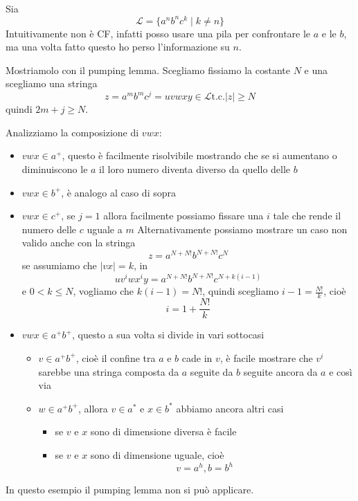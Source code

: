 \documentclass[12pt]{report}
\theoremstyle{definition}
\theoremstyle{regard}
\begin{document}
\begin{tcolorbox}[breakable]
Sia
$$ \mathcal{L} = \{ a^n b^n c^k \mid k \neq n \} $$
Intuitivamente non è CF, infatti posso usare una pila per confrontare le $a$ e le $b$, ma una volta fatto questo ho perso l'informazione su $n$.

Mostriamolo con il pumping lemma. 
Scegliamo fissiamo la costante $N$ e una scegliamo una stringa
	$$ z = a^m b^m c^j = u v w x y  \in \mathcal{L} \text{t.c.} |z| \geq N $$
quindi $2m + j \geq N$.

Analizziamo la composizione di $vwx$:
\begin{itemize}
	\item $vwx \in a^+$, questo è facilmente risolvibile mostrando che se si aumentano o diminuiscono le $a$ il loro numero diventa diverso da quello delle $b$
	\item $vwx \in b^+$, è analogo al caso di sopra
	\item $vwx \in c^+$, se $j = 1$ allora facilmente possiamo fissare una $i$ tale che rende il numero delle $c$ uguale a $m$
		Alternativamente possiamo mostrare un caso non valido anche con la stringa 
		$$ z = a^{N + N!} b^{N + N!} c^N $$
		se assumiamo che $|vx| = k$, in
		$$ u v^i w x^i y = a^{N + N!} b^{N + N!} c^{N + k(i - 1)} $$
		e $0 < k \leq N$, vogliamo che $k(i - 1) = N!$, quindi scegliamo $i - 1 = \frac{N!}{k}$, cioè
		$$ i = 1 + \frac{N!}{k} $$
	\item $vwx \in a^+b^+$, questo a sua volta si divide in vari sottocasi
		\begin{itemize}
			\item $v \in a^+ b^+$, cioè il confine tra $a$ e $b$ cade in $v$, è facile mostrare che $v^i$ sarebbe una stringa composta da $a$ seguite da $b$ seguite ancora da $a$ e così via
			\item $w \in a^+ b^+$, allora $v \in a^*$ e $x \in b^*$ abbiamo ancora altri casi
				\begin{itemize}
					\item se $v$ e $x$ sono di dimensione diversa è facile
					\item se $v$ e $x$ sono di dimensione uguale, cioè
						$$ v = a^h, b = b^h $$
				\end{itemize}
		\end{itemize}
\end{itemize}
In questo esempio il pumping lemma non si può applicare. %

\end{tcolorbox}
\end{document}
